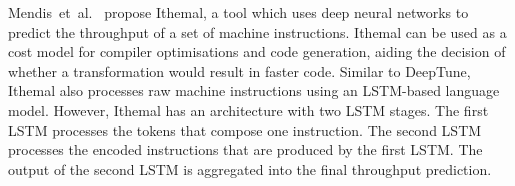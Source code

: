 Mendis~et~al.~\cite{mendis19} propose Ithemal, a tool which uses deep neural networks to predict the throughput of a set of machine instructions.
Ithemal can be used as a cost model for compiler optimisations and code generation, aiding the decision of whether a transformation would result in faster code.
Similar to DeepTune, Ithemal also processes raw machine instructions using an LSTM-based language model.
However, Ithemal has an architecture with two LSTM stages.
The first LSTM processes the tokens that compose one instruction.
The second LSTM processes the encoded instructions that are produced by the first LSTM.
The output of the second LSTM is aggregated into the final throughput prediction.